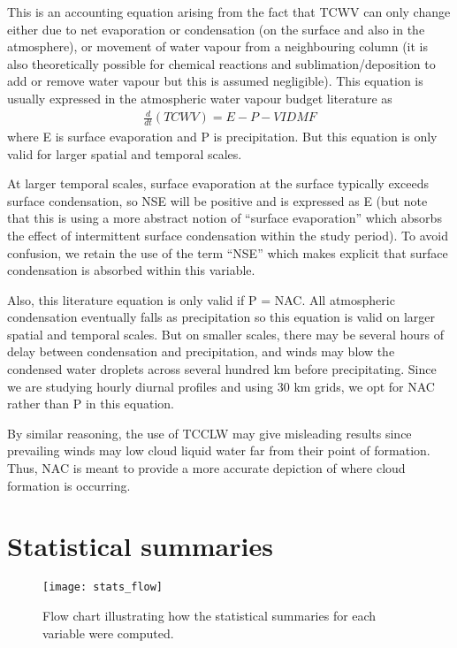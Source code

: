 This is an accounting equation arising from the fact that \ac{TCWV} can only change either due to net evaporation or condensation (on the surface and also in the atmosphere), or movement of water vapour from a neighbouring column (it is also theoretically possible for chemical reactions and sublimation/deposition to add or remove water vapour but this is assumed negligible). This equation is usually expressed in the atmospheric water vapour budget literature \citep{norris2020, yan2020} as
\begin{eqnarray}
	\frac{d}{dt}(TCWV) = E - P - VIDMF
\end{eqnarray}
where E is surface evaporation and P is precipitation. But this equation is only valid for larger spatial and temporal scales. 

At larger temporal scales, surface evaporation at the surface typically exceeds surface condensation, so \ac{NSE} will be positive and is expressed as E (but note that this is using a more abstract notion of “surface evaporation” which absorbs the effect of intermittent surface condensation within the study period). To avoid confusion, we retain the use of the term “NSE” which makes explicit that surface condensation is absorbed within this variable. 

Also, this literature equation is only valid if P = NAC. All atmospheric condensation eventually falls as precipitation so this equation is valid on larger spatial and temporal scales. But on smaller scales, there may be several hours of delay between condensation and precipitation, and winds may blow the condensed water droplets across several hundred km before precipitating. Since we are studying hourly diurnal profiles and using 30 km grids, we opt for \ac{NAC} rather than P in this equation.

By similar reasoning, the use of \ac{TCCLW} may give misleading results since prevailing winds may low cloud liquid water far from their point of formation. Thus, \ac{NAC} is meant to provide a more accurate depiction of where cloud formation is occurring.

\newpage

\section{Statistical summaries}
\label{sec:method_stats}

\begin{figure}[!ht]
	\centering
	\texttt{[image: stats\_flow]}
	\caption[Statistics Flow Chart]{Flow chart illustrating how the statistical summaries for each variable were computed.}
	\label{fig:stats_flow}
\end{figure}

